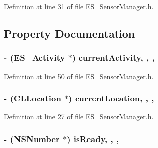Definition at line 31 of file E\+S\+\_\+\+Sensor\+Manager.\+h.



\subsection{Property Documentation}
\hypertarget{interface_e_s___sensor_manager_a142171a0db25411f1ec3b2d6699029d7}{
\subsubsection[{current\+Activity}]{\setlength{\rightskip}{0pt plus 5cm}-\/ ({\bf E\+S\+\_\+\+Activity} $\ast$) current\+Activity\hspace{0.3cm}{\ttfamily [read]}, {\ttfamily [write]}, {\ttfamily [nonatomic]}, {\ttfamily [strong]}}}\label{interface_e_s___sensor_manager_a142171a0db25411f1ec3b2d6699029d7}


Definition at line 50 of file E\+S\+\_\+\+Sensor\+Manager.\+h.

\hypertarget{interface_e_s___sensor_manager_a8f98f8169461263c9f7fe754d5ccc531}{
\subsubsection[{current\+Location}]{\setlength{\rightskip}{0pt plus 5cm}-\/ (C\+L\+Location $\ast$) current\+Location\hspace{0.3cm}{\ttfamily [read]}, {\ttfamily [write]}, {\ttfamily [nonatomic]}, {\ttfamily [strong]}}}\label{interface_e_s___sensor_manager_a8f98f8169461263c9f7fe754d5ccc531}


Definition at line 27 of file E\+S\+\_\+\+Sensor\+Manager.\+h.

\hypertarget{interface_e_s___sensor_manager_a87228331e9e81eb8b0aba211bafac0d5}{
\subsubsection[{is\+Ready}]{\setlength{\rightskip}{0pt plus 5cm}-\/ (N\+S\+Number $\ast$) is\+Ready\hspace{0.3cm}{\ttfamily [read]}, {\ttfamily [write]}, {\ttfamily [nonatomic]}, {\ttfamily [strong]}}}\label{interface_e_s___sensor_manager_a87228331e9e81eb8b0aba211bafac0d5}


